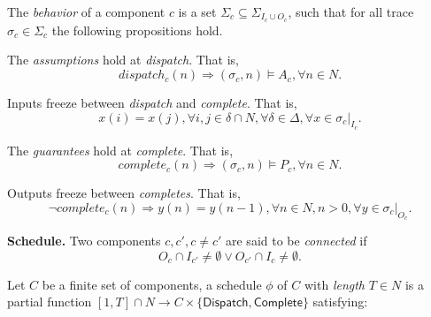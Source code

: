 
The \emph{behavior} of a component $c$ is a set $\Sigma_c \subseteq \Sigma_{I_c \cup O_c}$, such that for all trace $\sigma_c \in \Sigma_c$ the following propositions hold.

The \emph{assumptions} hold at \emph{dispatch}. That is,
\begin{equation} 
\label{eqn:assumption}
	dispatch_c(n) \Rightarrow (\sigma_c, n) \models A_c, \forall n\in N.
\end{equation}

Inputs freeze between \emph{dispatch} and \emph{complete}. That is,
\begin{equation} 
\label{eqn:inputfreeze}
	x(i) = x(j), \forall i,j\in \delta \cap N, \forall \delta \in \Delta, \forall x \in \sigma_c|_{I_c}.
\end{equation}

The \emph{guarantees} hold at \emph{complete}. That is,
\begin{equation} 
\label{eqn:guarantee}
	complete_c(n) \Rightarrow (\sigma_c, n) \models P_c, \forall n\in N.
\end{equation}

Outputs freeze between \emph{completes}. That is,
\begin{equation} 
\label{eqn:outputfreeze}
\lnot complete_c(n) \Rightarrow y(n) = y(n-1), \forall n \in N, n > 0, \forall y \in \sigma_c|_{O_c}.
\end{equation}

{\bf Schedule.}
Two components $ c, c', c\neq c'$ are said to be \emph{connected} if
\begin{equation*}
	O_c \cap I_{c'} \neq \emptyset \vee O_{c'} \cap I_c \neq \emptyset.
\end{equation*}

Let $C$ be a finite set of components, a schedule $\phi$ of $C$ with \emph{length} $T\in N$ is a partial function $[1, T]  \cap N\rightarrow C\times \{\textsf{Dispatch}, \textsf{Complete}\}$ satisfying:


